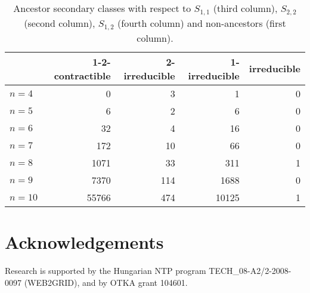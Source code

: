 \documentclass[]{article}
\begin{document}
\begin{table}\centering
    \begin{tabular}{lrrrr}
      \hline
       & 1-2-contractible & 2-irreducible & 1-irreducible & irreducible\\
      \hline
      $n=4$  &     0  &   3 &     1 & 0 \\
      $n=5$  &     6  &   2 &     6 & 0 \\
      $n=6$  &    32  &   4 &    16 & 0 \\
      $n=7$  &   172  &  10 &    66 & 0 \\
      $n=8$  &  1071  & 33  &   311 & {1}\\
      $n=9$  &  7370  & 114 &  1688 & 0 \\
      $n=10$ &  55766 & 474 & 10125 & {1}\\
      \hline
    \end{tabular}
  \caption{Ancestor secondary classes with respect to $S_{1,1}$ (third column), $S_{2,2}$ (second column), $S_{1,2}$ (fourth column) and non-ancestors (first column).}
  \label{tab:restricted}
\end{table}















\section{Acknowledgements}

Research is supported by the Hungarian NTP program TECH\_08-A2/2-2008-0097 (WEB2GRID), and by OTKA grant 104601.






\clearpage



\end{document}
